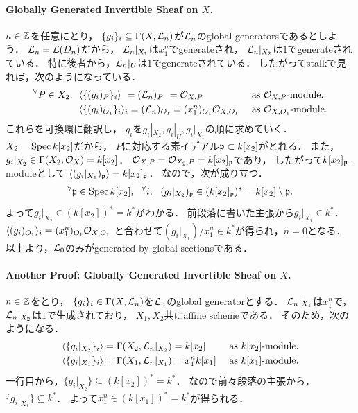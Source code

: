 \documentclass[a4paper]{jsarticle}
\begin{document}
    \paragraph{Globally Generated Invertible Sheaf on $X$.}
    $n \in \mathbb{Z}$を任意にとり，
    $\{g_i\}_i \subseteq \Gamma(X, \mathcal{L}_n)$が$\mathcal{L}_n$のglobal generatorsであるとしよう．
    $\mathcal{L}_n=\mathcal{L}(D_n)$だから，
    $\mathcal{L}_n|_{X_1}$は$x_1^n$でgenerateされ，
    $\mathcal{L}_n|_{X_2}$は$1$でgenerateされている．
    特に後者から，$\mathcal{L}_n|_{U}$は$1$でgenerateされている．
    したがってstalkで見れば，次のようになっている．
    \begin{align*}
        {}^{\forall} P \in X_2,~~
        &\langle \{(g_i)_{P}\}_i \rangle
            \hspace{3.5pt}
            =(\mathcal{L}_n)_{P}
            \hspace{3.7pt}
                =\mathcal{O}_{X, P}
                    &&\text{  as  $\mathcal{O}_{X, P}$-module.} \\
        &\langle \{(g_i)_{O_1}\}_i \rangle_i
            =(\mathcal{L}_n)_{O_1}
                =(x_1^n)_{O_1} \mathcal{O}_{X, O_1}
                    &&\text{  as  $\mathcal{O}_{X, O_1}$-module.}
    \end{align*}
    これらを可換環に翻訳し，
    $g_i$を$g_i|_{X_2}, g_i|_U, g_i|_{X_1}$の順に求めていく．
    $X_2=\operatorname{Spec} k[x_2]$だから，
    $P$に対応する素イデアル$\mathfrak{p} \subset k[x_2]$がとれる．
    また，$g_i|_{X_2} \in \Gamma(X_2, \mathcal{O}_X)=k[x_2]$．
    $\mathcal{O}_{X,P}=\mathcal{O}_{X_2, P}=k[x_2]_{\mathfrak{p}}$であり，
    したがって$k[x_2]_{\mathfrak{p}}$-moduleとして
    $\langle (g_i|_{X_1})_{\mathfrak{p}} \rangle=k[x_2]_{\mathfrak{p}}$．
    なので，次が成り立つ．
    \[
        {}^{\forall} \mathfrak{p} \in \operatorname{Spec} k[x_2],~~ {}^{\forall} i,~~
        (g_i|_{X_2})_{\mathfrak{p}} \in (k[x_2]_{\mathfrak{p}})^*=k[x_2] \setminus \mathfrak{p}.
    \]
    よって$g_i|_{X_2} \in (k[x_2])^*=k^*$がわかる．
    前段落に書いた主張から$g_i|_{X_1} \in k^*$．
    $\langle (g_i)_{O_1} \rangle_i=(x_1^n)_{O_1} \mathcal{O}_{X, O_1}$
    と合わせて$(g_i|_{X_1})/x_1^{n} \in k^*$が得られ，$n=0$となる．
    以上より，$\mathcal{L}_0$のみがgenerated by global sectionsである．

    \paragraph{Another Proof: Globally Generated Invertible Sheaf on $X$.}
    $n \in \mathbb{Z}$をとり，
    $\{g_i\}_i \in \Gamma(X, \mathcal{L}_n)$を$\mathcal{L}_n$のglobal generatorとする．
    $\mathcal{L}_n|_{X_1}$は$x_1^n$で，$\mathcal{L}_n|_{X_2}$は$1$で生成されており，
    $X_1, X_2$共にaffine schemeである．
    そのため，次のようになる．
    \begin{align*}
        &\langle \{ g_i|_{X_2} \}_i \rangle
            =\Gamma(X_2, \mathcal{L}_n|_{X_2})
               =k[x_2]
                    &&\text{  as  $k[x_2]$-module.} \\
        &\langle \{ g_i|_{X_1} \}_i \rangle
            =\Gamma(X_1, \mathcal{L}_n|_{X_1})
                =x_1^n k[x_1]
                    &&\text{  as  $k[x_1]$-module.}
    \end{align*}
    一行目から，$\{g_i|_{X_2}\} \subseteq (k[x_2])^*=k^*$．
    なので前々段落の主張から，$\{g_i|_{X_1}\} \subseteq k^*$．
    よって$x_1^n \in (k[x_1])^*=k^*$が得られる．
\end{document}
